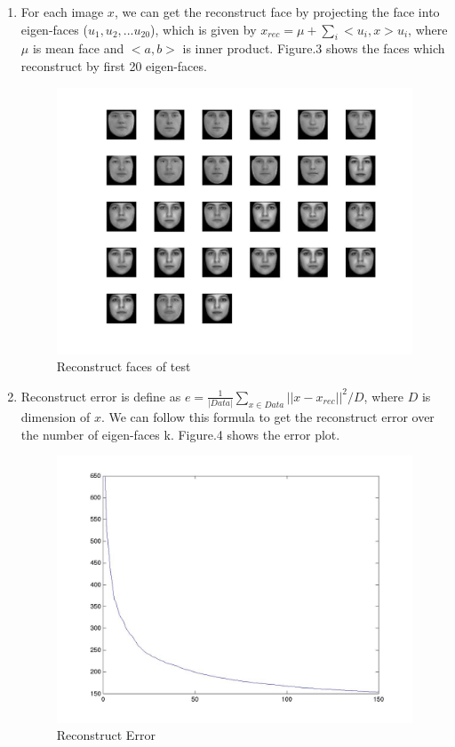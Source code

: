 \documentclass[12pt]{ctexart}
\begin{document}
\begin{enumerate}
\begin{enumerate}
\item 
For each image $x$, we can get the reconstruct face by projecting the face into eigen-faces ($u_1, u_2, ... u_{20}$), which is given by $x_{rec} = \mu + \sum_i <u_i, x> u_i$, where $\mu$ is mean face and $<a, b>$ is inner product. Figure.3 shows the faces which reconstruct by first 20 eigen-faces.  \\
\begin{figure}[H]
  \centering
  \includegraphics[scale=0.3]{a_reconstrustface.jpg} 
  \caption{Reconstruct faces of test}
\end{figure}

\item
Reconstruct error is define as $e = \frac{1}{|Data|} \sum_{x \in Data} ||x - x_{rec}||^2 / D$, where $D$ is dimension of $x$. We can follow this formula to get the reconstruct error over the number of eigen-faces k. Figure.4 shows the error plot. \\
\begin{figure}[H]
  \centering
  \includegraphics[scale=0.2]{a_reconstructerror.jpg} 
  \caption{Reconstruct Error}
\end{figure} 
\end{enumerate}


\end{enumerate}
\end{document}
